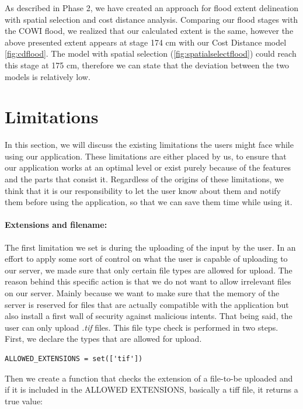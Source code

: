 As described in Phase 2, we have created an approach for flood extent delineation with spatial selection and cost distance analysis. Comparing our flood stages with the COWI flood, we realized that our calculated extent is the same, however the above presented extent appears at stage 174 cm with our Cost Distance model \autoref{fig:cdflood}. The model with spatial selection (\autoref{fig:spatialselectflood}) could reach this stage at 175 cm, therefore we can state that the deviation between the two models is relatively low. 

\section{Limitations}
In this section, we will discuss the existing limitations the users might face while using our application. These limitations are either placed by us, to ensure that our application works at an optimal level or exist purely because of the features and the parts that consist it. Regardless of the origins of these limitations, we think that it is our responsibility to let the user know about them and notify them before using the application, so that we can save them time while using it.

\paragraph{Extensions and filename:} The first limitation we set is during the uploading of the input by the user. In an effort to apply some sort of control on what the user is capable of uploading to our server, we made sure that only certain file types are allowed for upload. The reason behind this specific action is that we do not want to allow irrelevant files on our server. Mainly because we want to make sure that the memory of the server is reserved for files that are actually compatible with the application but also install a first wall of security against malicious intents. That being said, the user can only upload \textit{.tif} files. This file type check is performed in two steps. First, we declare the types that are allowed for upload.

\begin{lstlisting}
ALLOWED_EXTENSIONS = set(['tif'])
\end{lstlisting}

Then we create a function that checks the extension of a file-to-be uploaded and if it is included in the ALLOWED EXTENSIONS, basically a tiff file, it returns a true  value:

